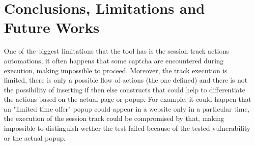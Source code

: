 \chapter{Conclusions, Limitations and Future Works}
One of the biggest limitations that the tool has is the session track actions automations, it often happens that some captcha are encountered during execution, making impossible to proceed. Moreover, the track execution is limited, there is only a possible flow of actions (the one defined) and there is not the possibility of inserting if then else constructs that could help to differentiate the actions based on the actual page or popup. For example, it could happen that an "limited time offer" popup could appear in a website only in a particular time, the execution of the session track could be compromised by that, making impossible to distinguish wether the test failed because of the tested vulnerability or the actual popup.



